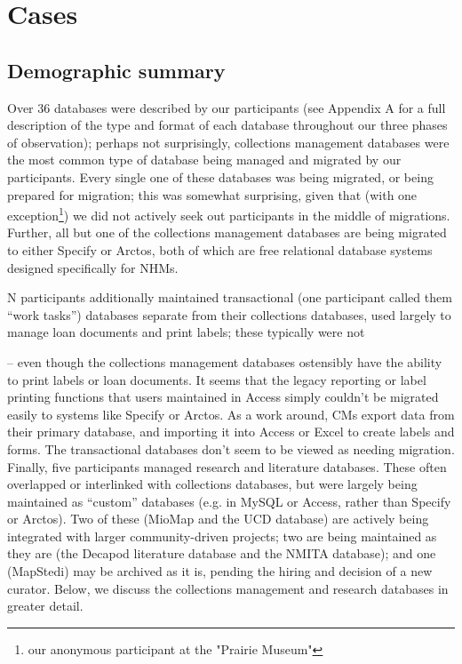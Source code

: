 \section{Cases}

\subsection{Demographic summary}

Over 36 databases were described by our participants (see Appendix A for a full description of the type and format of each database throughout our three phases of observation); perhaps not surprisingly, collections management databases were the most common type of database being managed and migrated by our participants. Every single one of these databases was being migrated, or being prepared for migration; this was somewhat surprising, given that (with one exception\footnote{our anonymous participant at the "Prairie Museum"}) we did not actively seek out participants in the middle of migrations. Further, all but one of the collections management databases are being migrated to either Specify or Arctos, both of which are free relational database systems designed specifically for NHMs. 

N participants additionally maintained transactional (one participant called them “work tasks”) databases separate from their collections databases, used largely to manage loan documents and print labels; these typically were not 

– even though the collections management databases ostensibly have the ability to print labels or loan documents. It seems that the legacy reporting or label printing functions that users maintained in Access simply couldn’t be migrated easily to systems like Specify or Arctos. As a work around, CMs export data from their primary database, and importing it into Access or Excel to create labels and forms. The transactional databases don’t seem to be viewed as needing migration. Finally, five participants managed research and literature databases. These often overlapped or interlinked with collections databases, but were largely being maintained as “custom” databases (e.g. in MySQL or Access, rather than Specify or Arctos). Two of these (MioMap and the UCD database) are actively being integrated with larger community-driven projects; two are being maintained as they are (the Decapod literature database and the NMITA database); and one (MapStedi) may be archived as it is, pending the hiring and decision of a new curator.  Below, we discuss the collections management and research databases in greater detail.

